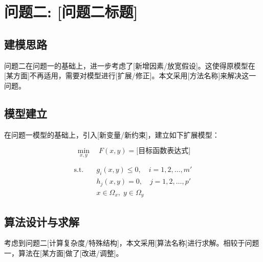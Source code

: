 
\section{问题二: [问题二标题]}

\subsection{建模思路}

问题二在问题一的基础上，进一步考虑了[新增因素/放宽假设]。这使得原模型在[某方面]不再适用，需要对模型进行[扩展/修正]。本文采用[方法名称]来解决这一问题。

\subsection{模型建立}

在问题一模型的基础上，引入[新变量/新约束]，建立如下扩展模型：

\begin{equation}
    \min_{x, y} \quad F(x, y) = \text{[目标函数表达式]}
\end{equation}

\begin{align}
    \text{s.t.} \quad
    & g_i(x, y) \leq 0, \quad i = 1, 2, \ldots, m' \\
    & h_j(x, y) = 0, \quad j = 1, 2, \ldots, p' \\
    & x \in \Omega_x, \; y \in \Omega_y
\end{align}

\subsection{算法设计与求解}

考虑到问题二[计算复杂度/特殊结构]，本文采用[算法名称]进行求解。相较于问题一，算法在[某方面]做了[改进/调整]。

